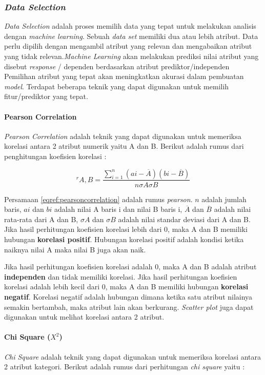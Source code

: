 \documentclass[a4paper,twoside]{article}
\begin{document}
\begin{enumerate}
\subsubsection{\textit{Data Selection}}
\textit{Data Selection} adalah proses memilih data yang tepat untuk melakukan analisis dengan \textit{machine learning}. Sebuah \textit{data set} memiliki dua atau lebih atribut. Data perlu dipilih dengan mengambil atribut yang relevan dan mengabaikan atribut yang tidak relevan.\textit{Machine Learning} akan melakukan prediksi nilai atribut yang disebut \textit{response} / dependen berdasarkan atribut prediktor/independen Pemilihan atribut yang tepat akan meningkatkan akurasi dalam pembuatan \textit{model}. Terdapat beberapa teknik yang dapat digunakan untuk memilih fitur/prediktor yang tepat.

\paragraph{Pearson Correlation}
\textit{Pearson Correlation} adalah teknik yang dapat digunakan untuk memeriksa korelasi antara 2 atribut numerik yaitu A dan B. Berikut adalah rumus dari penghitungan koefisien korelasi : 

\begin{equation}
^r A,B = \frac{\sum_{i=1}^{n}(ai - \overline{A})(bi - \overline{B})}{n\sigma A \sigma B}
\label{eqref:pearsoncorrelation}
\end{equation}

Persamaan \ref{eqref:pearsoncorrelation} adalah rumus \textit{pearson}. $n$ adalah jumlah baris, $ai$ dan $bi$ adalah nilai A baris i dan nilai B baris i, $ \overline{A} $  dan $\overline{B}$ adalah nilai rata-rata dari A dan B, $\sigma A$ dan $\sigma B$ adalah nilai standar deviasi dari A dan B. Jika hasil perhitungan koefisien korelasi lebih dari 0, maka A dan B memiliki hubungan \textbf{korelasi positif}. Hubungan korelasi positif adalah kondisi ketika naiknya nilai A maka nilai B juga akan naik. 

Jika hasil perhitungan koefisien korelasi adalah 0, maka A dan B adalah atribut \textbf{independen} dan tidak memiliki korelasi. Jika hasil perhitungan koefisien korelasi adalah lebih kecil dari 0, maka A dan B memiliki hubungan \textbf{korelasi negatif}. Korelasi negatif adalah hubungan dimana ketika satu atribut nilainya semakin bertambah, maka atribut lain akan berkurang. \textit{Scatter plot} juga dapat digunakan untuk melihat korelasi antara 2 atribut.  


\paragraph{Chi Square ($X^2 $)}
\textit{Chi Square} adalah teknik yang dapat digunakan untuk memeriksa korelasi antara 2 atribut kategori. Berikut adalah rumus dari perhitungan \textit{chi square} yaitu : 


\end{enumerate}
\end{document}
